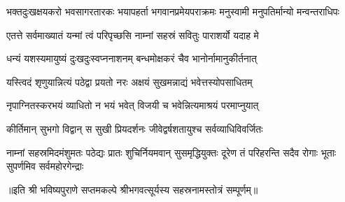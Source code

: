 \threelineshloka
{भक्तदुःखक्षयकरो भवसागरतारकः}
{भयापहर्ता भगवानप्रमेयपराक्रमः}
{मनुस्वामी मनुपतिर्मान्यो मन्वन्तराधिपः}%

\resetShloka
\twolineshloka
{एतत्ते सर्वमाख्यातं यन्मां त्वं परिपृच्छसि}
{नाम्नां सहस्रं सवितुः पाराशर्यो यदाह मे}

\twolineshloka
{धन्यं यशस्यमायुष्यं दुःखदुःस्वप्ननाशनम्}
{बन्धमोक्षकरं चैव भानोर्नामानुकीर्तनात्}

\twolineshloka
{यस्त्विदं शृणुयान्नित्यं पठेद्वा प्रयतो नरः}
{अक्षयं सुखमन्नाद्यं भवेत्तस्योपसाधितम्}

\twolineshloka
{नृपाग्नितस्करभयं व्याधितो न भयं भवेत्}
{विजयी च भवेन्नित्यमाश्रयं परमाप्नुयात्}

\twolineshloka
{कीर्तिमान् सुभगो विद्वान् स सुखी प्रियदर्शनः}
{जीवेद्वर्षशतायुश्च सर्वव्याधिविवर्जितः}

\fourlineindentedshloka
{नाम्नां सहस्रमिदमंशुमतः पठेद्यः}
{प्रातः शुचिर्नियमवान् सुसमृद्धियुक्तः}
{दूरेण तं परिहरन्ति सदैव रोगाः}
{भूताः सुपर्णमिव सर्वमहोरगेन्द्राः}

॥इति श्री भविष्यपुराणे सप्तमकल्पे श्रीभगवत्सूर्यस्य सहस्रनामस्तोत्रं सम्पूर्णम्॥